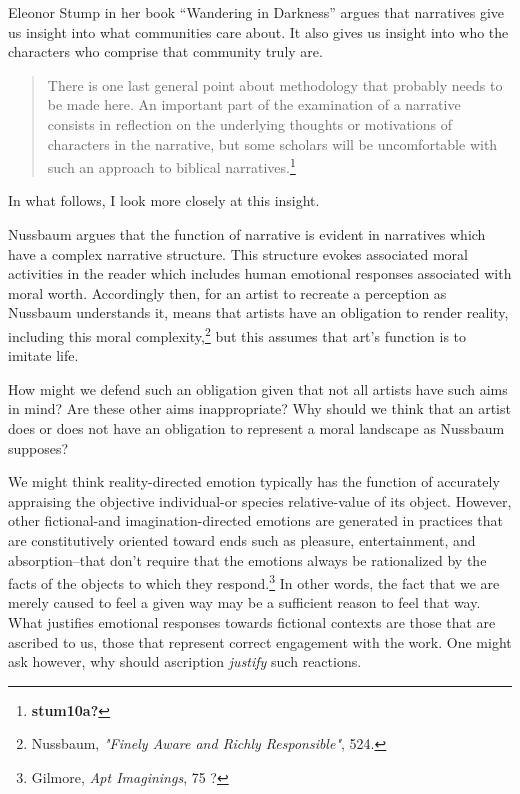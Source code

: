 \documentclass[
  12pt,
]{book}
\theoremstyle{definition}
\theoremstyle{definition}
\theoremstyle{definition}
\theoremstyle{definition}
\theoremstyle{remark}
\begin{document}
Eleonor Stump in her book ``Wandering in Darkness'' argues that narratives give us insight into what communities care about. It also gives us insight into who the characters who comprise that community truly are.

\begin{quote}
There is one last general point about methodology that probably needs to be made here. An important part of the examination of a narrative consists in reflection on the underlying thoughts or motivations of characters in the narrative, but some scholars will be uncomfortable with such an approach to biblical narratives.\footnote{\textbf{stum10a?}}
\end{quote}

\noindent In what follows, I look more closely at this insight.

Nussbaum argues that the function of narrative is evident in narratives which have a complex narrative structure. This structure evokes associated moral activities in the reader which includes human emotional responses associated with moral worth. Accordingly then, for an artist to recreate a perception as Nussbaum understands it, means that artists have an obligation to render reality, including this moral complexity,\footnote{Nussbaum, \emph{"{Finely Aware} and {Richly Responsible}"}, 524.} but this assumes that art's function is to imitate life.

How might we defend such an obligation given that not all artists have such aims in mind? Are these other aims inappropriate? Why should we think that an artist does or does not have an obligation to represent a moral landscape as Nussbaum supposes?

We might think reality-directed emotion typically has the function of accurately appraising the objective individual-or species relative-value of its object. However, other fictional-and imagination-directed emotions are generated in practices that are constitutively oriented toward ends such as pleasure, entertainment, and absorption--that don't require that the emotions always be rationalized by the facts of the objects to which they respond.\footnote{Gilmore, \emph{Apt {Imaginings}}, 75 ?} In other words, the fact that we are merely caused to feel a given way may be a sufficient reason to feel that way. What justifies emotional responses towards fictional contexts are those that are ascribed to us, those that represent correct engagement with the work. One might ask however, why should ascription \emph{justify} such reactions.
\end{document}
